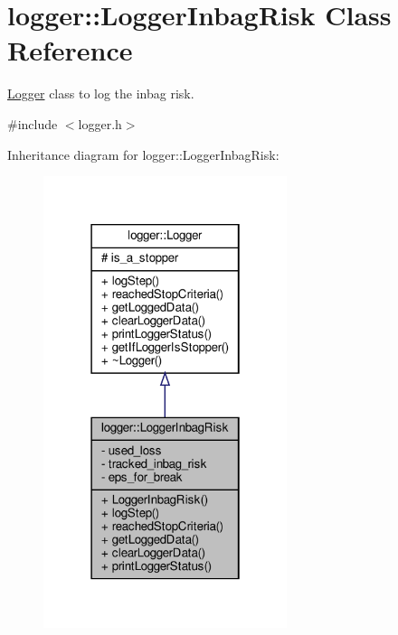 \hypertarget{classlogger_1_1_logger_inbag_risk}{}\section{logger\+:\+:Logger\+Inbag\+Risk Class Reference}
\label{classlogger_1_1_logger_inbag_risk}


\hyperlink{classlogger_1_1_logger}{Logger} class to log the inbag risk.  




{\ttfamily \#include $<$logger.\+h$>$}



Inheritance diagram for logger\+:\+:Logger\+Inbag\+Risk\+:
\nopagebreak
\begin{figure}[H]
\begin{center}
\leavevmode
\includegraphics[width=202pt]{classlogger_1_1_logger_inbag_risk__inherit__graph}
\end{center}
\end{figure}


